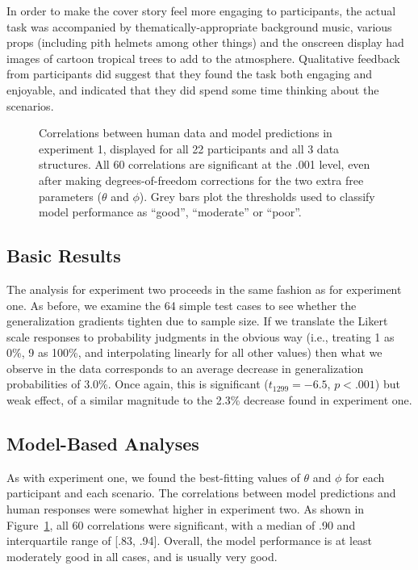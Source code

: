 \documentclass[doc]{apa6}
\begin{document}
In order to make the cover story feel more engaging to participants, the actual task was accompanied by thematically-appropriate background music, various props (including pith helmets among other things) and the onscreen display had images of cartoon tropical trees to add to the atmosphere. Qualitative feedback from participants did suggest that they found the task both engaging and enjoyable, and indicated that they did spend some time thinking about the scenarios.

\begin{figure}[t]
\begin{center}
\caption{Correlations between human data and model predictions in experiment 1, displayed for all 22 participants and all 3 data structures. All 60 correlations are significant at the .001 level, even after making degrees-of-freedom corrections for the two extra free parameters ($\theta$ and $\phi$). Grey bars plot the thresholds used to classify model performance as ``good'', ``moderate'' or ``poor''.}
\label{correl2}
\end{center}
\end{figure}


\subsection{Basic Results}

The analysis for experiment two proceeds in the same fashion as for experiment one. As before, we examine the 64 simple test cases to see whether the generalization gradients tighten due to sample size. If we translate the Likert scale responses to probability judgments in the obvious way (i.e., treating 1 as 0\%, 9 as 100\%, and interpolating linearly for all other values) then what we observe in the data corresponds to an average decrease in generalization probabilities of 3.0\%. Once again, this is significant ($t_{1299}=-6.5$, $p<.001$) but weak effect, of a similar magnitude to the 2.3\% decrease found in experiment one.


\subsection{Model-Based Analyses}

As with experiment one, we found the best-fitting values of $\theta$ and $\phi$ for each participant and each scenario. The correlations between model predictions and human responses were somewhat higher in experiment two. As shown in Figure~\ref{correl2}, all 60 correlations were significant, with a median of .90 and interquartile range of [.83, .94]. Overall, the model performance is at least moderately good in all cases, and is usually very good.
\end{document}
